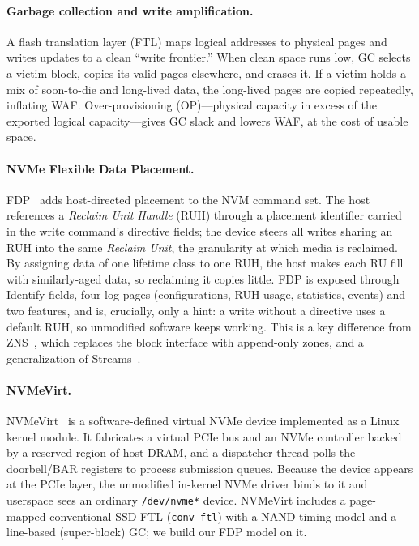 \documentclass[letterpaper,twocolumn,10pt]{article}
\begin{document}
\paragraph{Garbage collection and write amplification.}
A flash translation layer (FTL) maps logical addresses to physical pages and
writes updates to a clean ``write frontier.'' When clean space runs low, GC
selects a victim block, copies its valid pages elsewhere, and erases it. If a
victim holds a mix of soon-to-die and long-lived data, the long-lived pages are
copied repeatedly, inflating WAF. Over-provisioning (OP)---physical capacity in
excess of the exported logical capacity---gives GC slack and lowers WAF, at the
cost of usable space.

\paragraph{NVMe Flexible Data Placement.}
FDP~\cite{fdp:tp4146} adds host-directed placement to the NVM command set. The
host references a \emph{Reclaim Unit Handle} (RUH) through a placement
identifier carried in the write command's directive fields; the device steers
all writes sharing an RUH into the same \emph{Reclaim Unit}, the granularity at
which media is reclaimed. By assigning data of one lifetime class to one RUH,
the host makes each RU fill with similarly-aged data, so reclaiming it copies
little. FDP is exposed through Identify fields, four log pages (configurations,
RUH usage, statistics, events) and two features, and is, crucially, only a
hint: a write without a directive uses a default RUH, so unmodified software
keeps working. This is a key difference from ZNS~\cite{zns:atc21}, which
replaces the block interface with append-only zones, and a generalization of
Streams~\cite{multistream:hotstorage14}.

\paragraph{NVMeVirt.}
NVMeVirt~\cite{nvmevirt:fast23} is a software-defined virtual NVMe device
implemented as a Linux kernel module. It fabricates a virtual PCIe bus and an
NVMe controller backed by a reserved region of host DRAM, and a dispatcher
thread polls the doorbell/BAR registers to process submission queues. Because
the device appears at the PCIe layer, the unmodified in-kernel NVMe driver binds
to it and userspace sees an ordinary \texttt{/dev/nvme*} device. NVMeVirt
includes a page-mapped conventional-SSD FTL (\texttt{conv\_ftl}) with a NAND
timing model and a line-based (super-block) GC; we build our FDP model on it.
\end{document}
